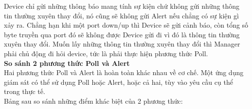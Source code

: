 \documentclass[12pt,oneside,a4paper]{article}
\begin{document}
Device chỉ gửi những thông báo mang tính sự kiện chứ không gửi những thông tin thường xuyên thay đổi, nó cũng sẽ không gửi Alert nếu chẳng có sự kiện gì xảy ra. Chẳng hạn khi một port down/up thì Device sẽ gửi cảnh báo, còn tổng số byte truyền qua port đó sẽ không được Device gửi đi vì đó là thông tin thường xuyên thay đổi. Muốn lấy những thông tin thường xuyên thay đổi thì Manager phải chủ động đi hỏi device, tức là phải thực hiện phương thức Poll.\\

\textbf{So sánh 2 phương thức Poll và Alert}\\

Hai phương thức Poll và Alert là hoàn toàn khác nhau về cơ chế. Một ứng dụng giám sát có thể sử dụng Poll hoặc Alert, hoặc cả hai, tùy vào yêu cầu cụ thể trong thực tế.\\

Bảng sau so sánh những điểm khác biệt của 2 phương thức:\\
\end{document}
